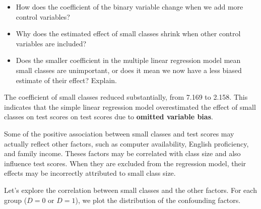 \documentclass[
  12pt,
  a4paper,
]{scrbook}
\providecommand{\tightlist}{%
  \setlength{\itemsep}{0pt}\setlength{\parskip}{0pt}}
\renewcommand{\tightlist}{\setlength{\itemsep}{0.5\baselineskip}\setlength{\parskip}{0.2\baselineskip}}
\theoremstyle{plain}
\theoremstyle{definition}
\theoremstyle{remark}
\begin{document}
\begin{itemize}
\tightlist
\item
  How does the coefficient of the binary variable change when we add
  more control variables?
\item
  Why does the estimated effect of small classes shrink when other
  control variables are included?
\item
  Does the smaller coefficient in the multiple linear regression model
  mean small classes are unimportant, or does it mean we now have a less
  biased estimate of their effect? Explain.
\end{itemize}

The coefficient of small classes reduced substantially, from 7.169 to
2.158. This indicates that the simple linear regression model
overestimated the effect of small classes on test scores on test scores
due to \textbf{omitted variable bias}.

Some of the positive association between small classes and test scores
may actually reflect other factors, such as computer availability,
English proficiency, and family income. Theses factors may be correlated
with class size and also influence test scores. When they are excluded
from the regression model, their effects may be incorrectly attributed
to small class size.

Let's explore the correlation between small classes and the other
factors. For each group (\(D=0\) or \(D=1\)), we plot the distribution
of the confounding factors.
\end{document}
